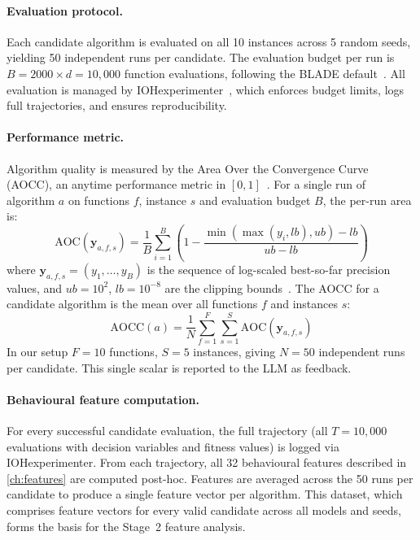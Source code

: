 \paragraph{Evaluation protocol.}
Each candidate algorithm is evaluated on all 10 instances across 5 random seeds, yielding 50 independent runs per candidate. The evaluation budget per run is $B = 2000 \times d = 10{,}000$ function evaluations, following the BLADE default~\cite{vanStein2025BLADE}. All evaluation is managed by IOHexperimenter~\cite{deNobel2024iohexperimenter}, which enforces budget limits, logs full trajectories, and ensures reproducibility.

\paragraph{Performance metric.}
Algorithm quality is measured by the Area Over the Convergence Curve (AOCC), an anytime performance metric in $[0, 1]$~\cite{vanStein2024LLaMEA}. For a single run of algorithm $a$ on functions $f$, instance $s$ and evaluation budget $B$, the per-run area is:
\begin{equation}
\label{eq:aoc-run}
\text{AOC}(\mathbf{y}_{a,f,s}) = \frac{1}{B} \sum_{i=1}^{B} \left(1 - \frac{\min(\max(y_i, lb), ub) - lb}{ub - lb}\right)
\end{equation}
where $\mathbf{y}_{a,f,s} = (y_1, \ldots, y_B)$ is the sequence of log-scaled best-so-far precision values, and $ub = 10^{2}$, $lb = 10^{-8}$ are the clipping bounds~\cite{vanStein2024LLaMEA}. The AOCC for a candidate algorithm is the mean over all functions $f$ and instances $s$:
\begin{equation}
\label{eq:aocc}
\text{AOCC}(a) = \frac{1}{N} \sum_{f=1}^{F} \sum_{s=1}^{S} \text{AOC}(\mathbf{y}_{a,f,s})
\end{equation}
In our setup $F = 10$ functions, $S = 5$ instances, giving $N = 50$ independent runs per candidate. This single scalar is reported to the LLM as feedback.

\paragraph{Behavioural feature computation.}
For every successful candidate evaluation, the full trajectory (all $T = 10{,}000$ evaluations with decision variables and fitness values) is logged via IOHexperimenter. From each trajectory, all 32 behavioural features described in \cref{ch:features} are computed post-hoc. Features are averaged across the 50 runs per candidate to produce a single feature vector per algorithm. This dataset, which comprises feature vectors for every valid candidate across all models and seeds, forms the basis for the Stage~2 feature analysis.

